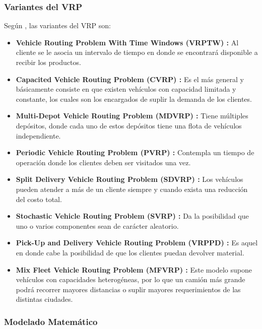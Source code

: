 \subsubsection {Variantes del VRP}
Según \cite{[GOLDEN-ASSAD]}, las variantes del VRP son:
\begin{itemize}
\item \textbf{Vehicle Routing Problem With Time Windows (VRPTW) : }Al cliente se le asocia  un intervalo de tiempo en donde se encontrará disponible a recibir los productos. 
\item \textbf{Capacited Vehicle Routing Problem (CVRP) : } Es el más general y básicamente consiste en que existen vehículos con capacidad limitada y constante, los cuales son los encargados de suplir la demanda de los clientes.
\item \textbf{Multi-Depot Vehicle Routing Problem (MDVRP) : }Tiene múltiples depósitos, donde cada uno de estos depósitos tiene una flota de vehículos independiente.
\item \textbf{Periodic Vehicle Routing Problem (PVRP) : }Contempla un tiempo de operación donde los clientes deben ser visitados una vez. 
\item \textbf{Split Delivery Vehicle Routing Problem (SDVRP) : }Los vehículos pueden atender a más de un cliente siempre y cuando exista una reducción del costo total.
\item \textbf{Stochastic Vehicle Routing Problem (SVRP) : } Da la posibilidad que uno o varios componentes sean de carácter aleatorio.
\item \textbf{Pick-Up and Delivery Vehicle Routing Problem (VRPPD) : }Es aquel en donde cabe la posibilidad de que los clientes puedan devolver material.
\item \textbf{Mix Fleet Vehicle Routing Problem (MFVRP) : }Este modelo supone vehículos con capacidades heterogéneas, por lo que un camión más grande podrá recorrer mayores distancias o suplir mayores requerimientos de las distintas ciudades. 
\end{itemize}

\subsubsection {Modelado Matemático }

